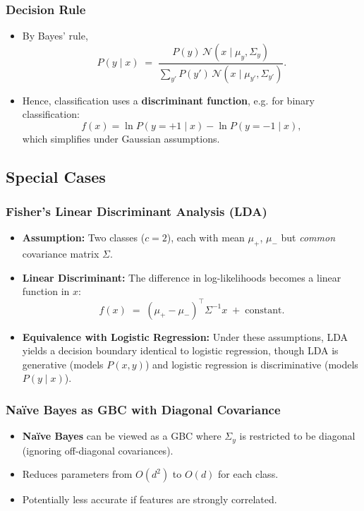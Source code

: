 \documentclass[twocolumn]{article}
\begin{document}
\begin{spacing}{1}
\subsubsection{Decision Rule}
\begin{itemize}
    \item By Bayes' rule,
    \[
        P(y \mid x) 
        \;=\; 
        \frac{
            P(y)\,\mathcal{N}(x \mid \mu_y,\Sigma_y)
        }{
            \sum_{y'} P(y')\,\mathcal{N}(x \mid \mu_{y'},\Sigma_{y'})
        }.
    \]
    \item Hence, classification uses a \textbf{discriminant function}, e.g. for binary classification:
    \[
        f(x) = \ln P(y=+1 \mid x) - \ln P(y=-1 \mid x),
    \]
    which simplifies under Gaussian assumptions.
\end{itemize}

\subsection{Special Cases}
\subsubsection{Fisher’s Linear Discriminant Analysis (LDA)}
\begin{itemize}
    \item \textbf{Assumption:} Two classes ($c=2$), each with mean $\mu_+$, $\mu_-$ but \emph{common} covariance matrix $\Sigma$.
    \item \textbf{Linear Discriminant:} The difference in log-likelihoods becomes a linear function in $x$:
    \[
        f(x) 
        \;=\;
        (\mu_+ - \mu_-)^\top \Sigma^{-1} x 
        \;+\;
        \text{constant}.
    \]
    \item \textbf{Equivalence with Logistic Regression:} Under these assumptions, LDA yields a decision boundary identical to logistic regression, though LDA is generative (models $P(x,y)$) and logistic regression is discriminative (models $P(y\mid x)$).
\end{itemize}

\subsubsection{Na\"ive Bayes as GBC with Diagonal Covariance}
\begin{itemize}
    \item \textbf{Na\"ive Bayes} can be viewed as a GBC where $\Sigma_y$ is restricted to be diagonal (ignoring off-diagonal covariances).
    \item Reduces parameters from $O(d^2)$ to $O(d)$ for each class.
    \item Potentially less accurate if features are strongly correlated.
\end{itemize}


\end{spacing}
\end{document}
